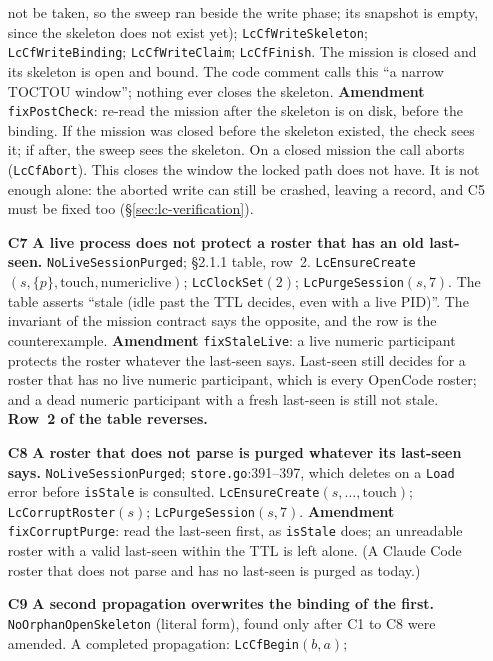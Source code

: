\documentclass[a4paper,10pt,fleqn]{article}
\newcommand{\fpath}[1]{\texttt{#1}}
\newcommand{\field}[1]{\texttt{#1}}
\begin{document}
\begin{enumerate}
    not be taken, so the sweep ran beside the write phase; its snapshot is
    empty, since the skeleton does not exist yet);
    \field{LcCfWriteSkeleton}; \field{LcCfWriteBinding}; \field{LcCfWriteClaim};
    \field{LcCfFinish}. The mission is closed and its skeleton is open and
    bound. The code comment calls this ``a narrow TOCTOU window''; nothing
    ever closes the skeleton. \textbf{Amendment} \field{fixPostCheck}: re-read
    the mission after the skeleton is on disk, before the binding. If the
    mission was closed before the skeleton existed, the check sees it; if
    after, the sweep sees the skeleton. On a closed mission the call aborts
    (\field{LcCfAbort}). This closes the window the locked path does not have.
    It is not enough alone: the aborted write can still be crashed, leaving
    a record, and C5 must be fixed too (\S\ref{sec:lc-verification}).
  \item[\textbf{C7}] \textbf{A live process does not protect a roster that
    has an old last-seen.} \field{NoLiveSessionPurged}; \S2.1.1 table, row~2.
    \field{LcEnsureCreate}$(s,\{p\},\mathrm{touch},\mathrm{numeric live})$;
    \field{LcClockSet}$(2)$; \field{LcPurgeSession}$(s,7)$. The table asserts
    ``stale (idle past the TTL decides, even with a live PID)''. The invariant
    of the mission contract says the opposite, and the row is the
    counterexample. \textbf{Amendment} \field{fixStaleLive}: a live numeric
    participant protects the roster whatever the last-seen says. Last-seen
    still decides for a roster that has no live numeric participant, which is
    every OpenCode roster; and a dead numeric participant with a fresh
    last-seen is still not stale. \textbf{Row~2 of the table reverses.}
  \item[\textbf{C8}] \textbf{A roster that does not parse is purged whatever
    its last-seen says.} \field{NoLiveSessionPurged}; \fpath{store.go}:391--397,
    which deletes on a \field{Load} error before \field{isStale} is consulted.
    \field{LcEnsureCreate}$(s,\ldots,\mathrm{touch})$; \field{LcCorruptRoster}$(s)$;
    \field{LcPurgeSession}$(s,7)$. \textbf{Amendment} \field{fixCorruptPurge}: read
    the last-seen first, as \field{isStale} does; an unreadable roster with a
    valid last-seen within the TTL is left alone. (A Claude Code roster that
    does not parse and has no last-seen is purged as today.)
  \item[\textbf{C9}] \textbf{A second propagation overwrites the binding of
    the first.} \field{NoOrphanOpenSkeleton} (literal form), found only
    after C1 to C8 were amended. A completed propagation: \field{LcCfBegin}$(b,a)$;

\end{enumerate}
\end{document}
